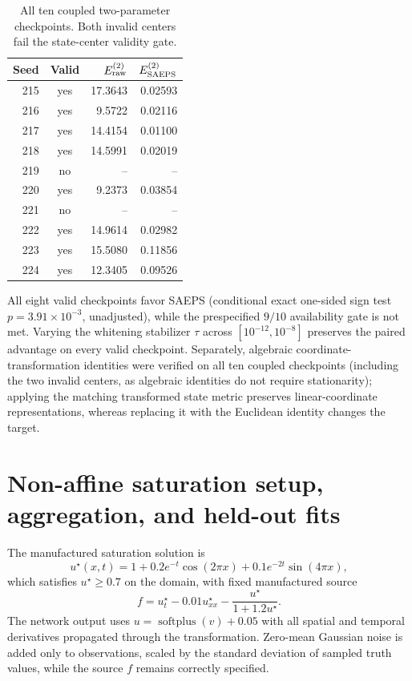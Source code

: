 \documentclass[10pt,letterpaper]{article}
\begin{document}
\begin{table}[!htbp]
\centering\small
\caption{All ten coupled two-parameter checkpoints. Both invalid centers fail the state-center validity gate.}
\begin{tabular}{rcrr}
\toprule
Seed & Valid & $E_{\rm raw}^{(2)}$ & $E_{\rm SAEPS}^{(2)}$\\\midrule
215 & yes & 17.3643 & 0.02593\\
216 & yes & 9.5722 & 0.02116\\
217 & yes & 14.4154 & 0.01100\\
218 & yes & 14.5991 & 0.02019\\
219 & no & -- & --\\
220 & yes & 9.2373 & 0.03854\\
221 & no & -- & --\\
222 & yes & 14.9614 & 0.02982\\
223 & yes & 15.5080 & 0.11856\\
224 & yes & 12.3405 & 0.09526\\\bottomrule
\end{tabular}
\end{table}
All eight valid checkpoints favor SAEPS (conditional exact one-sided sign test $p=3.91\times10^{-3}$, unadjusted), while the prespecified $9/10$ availability gate is not met.
Varying the whitening stabilizer $\tau$ across $[10^{-12},10^{-8}]$ preserves the paired advantage on every valid checkpoint.
Separately, algebraic coordinate-transformation identities were verified on all ten coupled checkpoints (including the two invalid centers, as algebraic identities do not require stationarity); applying the matching transformed state metric preserves linear-coordinate representations, whereas replacing it with the Euclidean identity changes the target.



\section{Non-affine saturation setup, aggregation, and held-out fits}
The manufactured saturation solution is
\begin{equation}
 u^\star(x,t)=1+0.2e^{-t}\cos(2\pi x)+0.1e^{-2t}\sin(4\pi x),
\end{equation}
which satisfies $u^\star\ge 0.7$ on the domain, with fixed manufactured source
\begin{equation}
 f=u_t^\star-0.01u_{xx}^\star-\frac{u^\star}{1+1.2u^\star}.
\end{equation}
The network output uses $u=\operatorname{softplus}(v)+0.05$ with all spatial and temporal derivatives propagated through the transformation.
Zero-mean Gaussian noise is added only to observations, scaled by the standard deviation of sampled truth values, while the source $f$ remains correctly specified.
\end{document}

